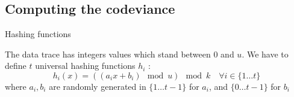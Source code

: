 \documentclass[mathserif]{beamer}
\begin{document}
	\subsection{Computing the codeviance}
	
	\begin{frame}{Hashing functions}
	
	\begin{block}{}
	The data trace has integers values which stand between $0$ and $u$. We have to define $t$ universal hashing functions $h_i$ :
	\[ h_i(x) = ((a_ix+b_i) \mod u) \mod k \quad \forall i \in \lbrace 1 \ldots t \rbrace \]
where $a_i, b_i$ are randomly generated in $\lbrace 1 \dots t-1 \rbrace$ for $a_i$, and $\lbrace 0 \ldots t-1 \rbrace$ for $b_i$
	\end{block}
	
	\end{frame}
	
\end{document}
